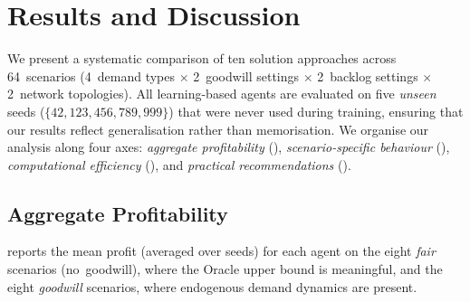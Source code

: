 
\section{Results and Discussion}\label{sec:results}

We present a systematic comparison of ten solution approaches across
64~scenarios (4~demand types $\times$ 2~goodwill settings $\times$
2~backlog settings $\times$ 2~network topologies). All learning-based
agents are evaluated on five \emph{unseen} seeds ($\{42, 123, 456, 789,
999\}$) that were never used during training, ensuring that our results
reflect generalisation rather than memorisation. We organise our analysis
along four axes: \emph{aggregate profitability} (),
\emph{scenario-specific behaviour} (),
\emph{computational efficiency} (), and
\emph{practical recommendations} ().

\subsection{Aggregate Profitability}\label{sec:aggregate}

 reports the mean profit (averaged over seeds)
for each agent on the eight \emph{fair} scenarios (no~goodwill), where
the Oracle upper bound is meaningful, and the eight \emph{goodwill}
scenarios, where endogenous demand dynamics are present.

